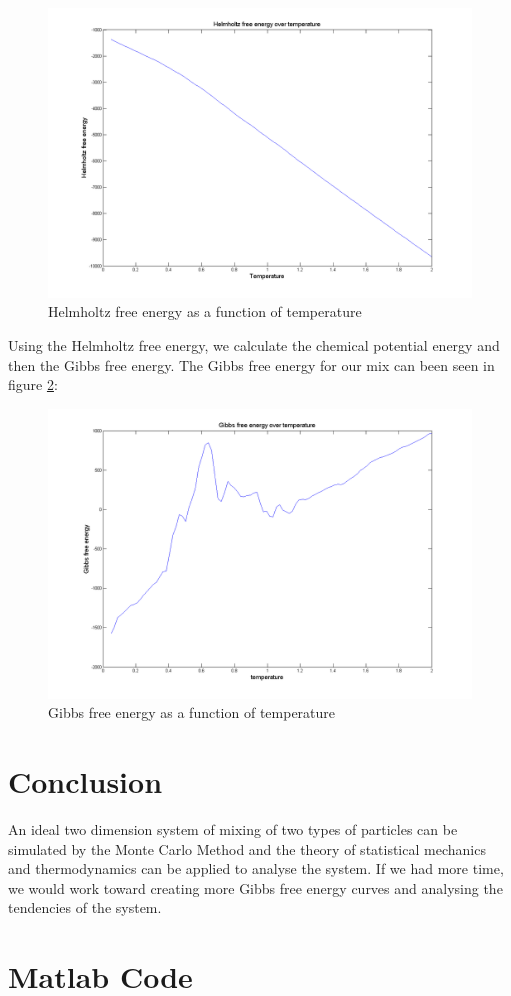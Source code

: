 \documentclass[12pt,a4paper]{report}
\begin{document}
\begin{figure}[h]
\centering
\includegraphics[width=\textwidth]{FoverT.png}
\caption{Helmholtz free energy as a function of temperature}
\label{fig:FoverT}
\end{figure}

Using the Helmholtz free energy, we calculate the chemical potential energy and then the Gibbs free energy. The Gibbs free energy for our mix can been seen in figure \ref{fig:GoverT}:

\begin{figure}[h]
\centering
\includegraphics[width=\textwidth]{GoverT.png}
\caption{Gibbs free energy as a function of temperature}
\label{fig:GoverT}
\end{figure}

   

\chapter{Conclusion}
An ideal two dimension system of mixing of two types of particles can be simulated by the Monte Carlo Method and the theory of statistical mechanics and thermodynamics can be applied to analyse the system. If we had more time, we would work toward creating more Gibbs free energy curves and analysing the tendencies of the system.

\chapter{Matlab Code}





\end{document}
